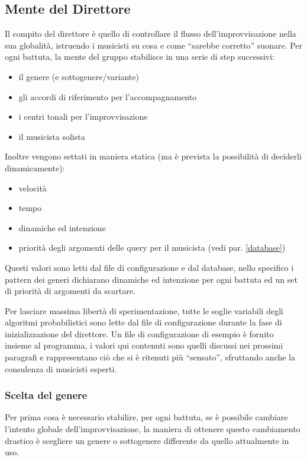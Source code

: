 \subsection{Mente del Direttore}
Il compito del direttore è quello di controllare il flusso dell'improvvisazione nella sua globalità, istruendo i musicisti su cosa e come ``sarebbe corretto'' suonare. 
Per ogni battuta, la mente del gruppo stabilisce in una serie di step successivi:
\begin{itemize}
\item il genere (e sottogenere/variante)
\item gli accordi di riferimento per l'accompagnamento
\item i centri tonali per l'improvvisazione
\item il musicista solista
\end{itemize}

\noindent
Inoltre vengono settati in maniera statica (ma è prevista la possibilità di deciderli dinamicamente):
\begin{itemize}
\item velocità
\item tempo
\item dinamiche ed intenzione
\item priorità degli argomenti delle query per il musicista (vedi par. \ref{database})
\end{itemize}

Questi valori sono letti dal file di configurazione e dal database, nello specifico i pattern dei generi dichiarano dinamiche ed intenzione per ogni battuta ed un set di priorità di argomenti da scartare.

Per lasciare massima libertà di sperimentazione, tutte le soglie variabili degli algoritmi probabilistici sono lette dal file di configurazione durante la fase di inizializzazione del direttore.
Un file di configurazione di esempio è fornito insieme al programma, i valori qui contenuti sono quelli discussi nei prossimi paragrafi e rappresentano ciò che si è ritenuti più ``sensato'', sfruttando anche la consulenza di musicisti esperti.

\subsubsection{Scelta del genere}
Per prima cosa è necessario stabilire, per ogni battuta, se è possibile cambiare l'intento globale dell'improvvisazione, la maniera di ottenere questo cambiamento drastico è scegliere un genere o sottogenere differente da quello attualmente in uso.

